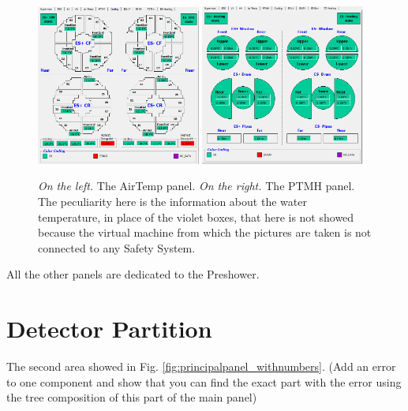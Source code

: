 \documentclass[12pt]{article}
\begin{document}
\begin{figure}[!h]
	\centering
	\includegraphics[width=0.48\textwidth]{Pics/ESEnv.png}
	\quad 
	\includegraphics[width=0.48\textwidth]{Pics/ESHeat.png}
	\caption{\textit{On the left.} The AirTemp panel. \textit{On the right.} The PTMH panel. The peculiarity here is the information about the water temperature, in place of the violet boxes, that here is not showed because the virtual machine from which the pictures are taken is not connected to any Safety System.}
	\label{fig:AirPTHM}
\end{figure}
All the other panels are dedicated to the Preshower.

\section{Detector Partition}
The second area showed in Fig. \ref{fig:principalpanel_withnumbers}.
(Add an error to one component and show that you can find the exact part with the error using the tree composition of this part of the main panel)
\end{document}
